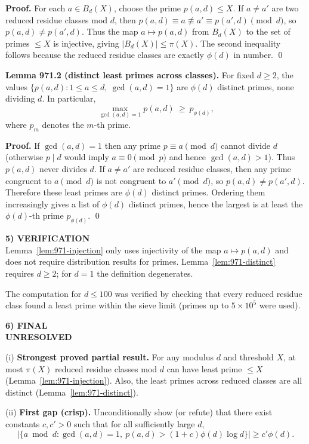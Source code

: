 \noindent\textbf{Proof.}
For each $a\in B_d(X)$, choose the prime $p(a,d)\le X$.
If $a\ne a'$ are two reduced residue classes mod $d$, then $p(a,d)\equiv a\not\equiv a'\equiv p(a',d)\pmod d$, so $p(a,d)\ne p(a',d)$.
Thus the map $a\mapsto p(a,d)$ from $B_d(X)$ to the set of primes $\le X$ is injective, giving $|B_d(X)|\le \pi(X)$.
The second inequality follows because the reduced residue classes are exactly $\phi(d)$ in number. \qed

\medskip
\noindent\textbf{Lemma 971.2 (distinct least primes across classes).}\label{lem:971-distinct}
For fixed $d\ge 2$, the values $\{p(a,d): 1\le a\le d,\ \gcd(a,d)=1\}$ are $\phi(d)$ distinct primes, none dividing $d$.
In particular,
\[
\max_{\gcd(a,d)=1} p(a,d)\ \ge\ p_{\phi(d)},
\]
where $p_m$ denotes the $m$-th prime.

\noindent\textbf{Proof.}
If $\gcd(a,d)=1$ then any prime $p\equiv a\pmod d$ cannot divide $d$ (otherwise $p\mid d$ would imply $a\equiv 0\pmod p$ and hence $\gcd(a,d)>1$).  Thus $p(a,d)$ never divides $d$.
If $a\ne a'$ are reduced residue classes, then any prime congruent to $a\pmod d$ is not congruent to $a'\pmod d$, so $p(a,d)\ne p(a',d)$.  Therefore these least primes are $\phi(d)$ distinct primes.
Ordering them increasingly gives a list of $\phi(d)$ distinct primes, hence the largest is at least the $\phi(d)$-th prime $p_{\phi(d)}$. \qed

\medskip
\noindent\textbf{5) VERIFICATION}\\
Lemma~\ref{lem:971-injection} only uses injectivity of the map $a\mapsto p(a,d)$ and does not require distribution results for primes.
Lemma~\ref{lem:971-distinct} requires $d\ge 2$; for $d=1$ the definition degenerates.

The computation for $d\le 100$ was verified by checking that every reduced residue class found a least prime within the sieve limit (primes up to $5\times 10^5$ were used).

\medskip
\noindent\textbf{6) FINAL}\\
\textbf{UNRESOLVED}

(i) \textbf{Strongest proved partial result.} For any modulus $d$ and threshold $X$, at most $\pi(X)$ reduced residue classes mod $d$ can have least prime $\le X$ (Lemma~\ref{lem:971-injection}).  Also, the least primes across reduced classes are all distinct (Lemma~\ref{lem:971-distinct}).

(ii) \textbf{First gap (crisp).} Unconditionally show (or refute) that there exist constants $c,c'>0$ such that for all sufficiently large $d$,
\[
|\{a\bmod d: \gcd(a,d)=1,\ p(a,d)>(1+c)\phi(d)\log d\}|\ge c'\phi(d).
\]

